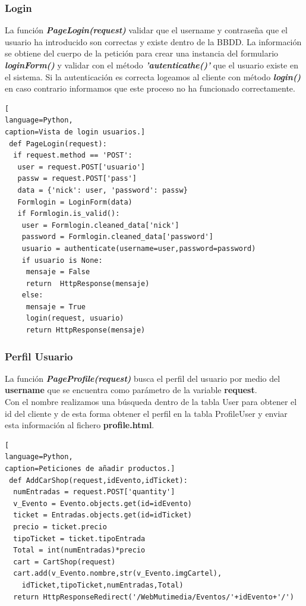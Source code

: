 \subsubsection*{Login}
La función \textit{\textbf{PageLogin(request)}} validar que el username y contraseña que el usuario ha introducido son correctas y existe dentro de la BBDD. La información se obtiene del cuerpo de la petición para crear una instancia del formulario \textbf{\textit{loginForm()}} y validar con el método \textit{\textbf{'autenticathe()'}} que el usuario existe en el sistema. Si la autenticación es correcta logeamos al cliente con  método \textit{\textbf{login()}} en caso contrario informamos que este proceso no ha funcionado correctamente.
\begin{lstlisting}[
language=Python,
caption=Vista de login usuarios.]
 def PageLogin(request):
  if request.method == 'POST':
   user = request.POST['usuario']
   passw = request.POST['pass']
   data = {'nick': user, 'password': passw}
   Formlogin = LoginForm(data)
   if Formlogin.is_valid():
    user = Formlogin.cleaned_data['nick']
    password = Formlogin.cleaned_data['password']
    usuario = authenticate(username=user,password=password)
    if usuario is None:
     mensaje = False
     return  HttpResponse(mensaje)
    else:
     mensaje = True
     login(request, usuario)
     return HttpResponse(mensaje)	
\end{lstlisting}
\subsubsection*{Perfil Usuario}
La función \textit{\textbf{PageProfile(request)}} busca el perfil del usuario por medio del \textbf{username} que se encuentra como parámetro de la variable \textbf{request}.
\\Con el nombre realizamos una búsqueda dentro de la tabla User para obtener el id del cliente y de esta forma obtener el perfil en la tabla ProfileUser y enviar esta información al fichero \textbf{profile.html}.
\begin{lstlisting}[
language=Python,
caption=Peticiones de añadir productos.]
 def AddCarShop(request,idEvento,idTicket):
  numEntradas = request.POST['quantity']
  v_Evento = Evento.objects.get(id=idEvento)
  ticket = Entradas.objects.get(id=idTicket)
  precio = ticket.precio
  tipoTicket = ticket.tipoEntrada
  Total = int(numEntradas)*precio
  cart = CartShop(request)
  cart.add(v_Evento.nombre,str(v_Evento.imgCartel),
    idTicket,tipoTicket,numEntradas,Total)
  return HttpResponseRedirect('/WebMutimedia/Eventos/'+idEvento+'/')
\end{lstlisting}
